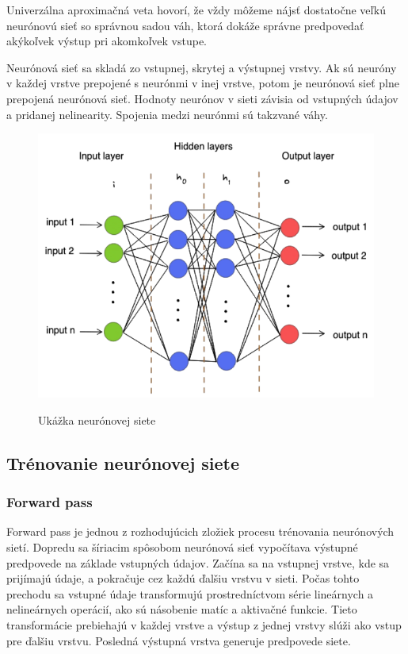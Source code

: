 Univerzálna aproximačná veta hovorí, že vždy môžeme nájsť dostatočne veľkú neurónovú sieť so správnou sadou váh, ktorá dokáže správne predpovedať akýkoľvek výstup pri akomkoľvek vstupe.

Neurónová sieť sa skladá zo vstupnej, skrytej a výstupnej vrstvy. Ak sú neuróny v každej vrstve prepojené s neurónmi v inej vrstve, potom je neurónová sieť plne prepojená neurónová sieť.  Hodnoty neurónov v sieti závisia od vstupných údajov a pridanej nelinearity. Spojenia medzi neurónmi sú takzvané váhy.

\begin{figure}[H]
\includegraphics{images/neuronova_siet.png}\label{img:neuronova_siet}
\caption{Ukážka neurónovej siete}
\end{figure}
\subsection{Trénovanie neurónovej siete}\label{subsec:trening}

\subsubsection{Forward pass}\label{subsubsec:forward_pass}

Forward pass je jednou z rozhodujúcich zložiek procesu trénovania neurónových sietí.
Dopredu sa šíriacim spôsobom neurónová sieť vypočítava výstupné predpovede na
základe vstupných údajov. Začína sa na vstupnej vrstve, kde sa prijímajú údaje, a
pokračuje cez každú ďalšiu vrstvu v sieti. Počas tohto prechodu sa vstupné údaje
transformujú prostredníctvom série lineárnych a nelineárnych operácií, ako sú
násobenie matíc a aktivačné funkcie. Tieto transformácie prebiehajú v každej vrstve a
výstup z jednej vrstvy slúži ako vstup pre ďalšiu vrstvu. Posledná výstupná vrstva
generuje predpovede siete. 

